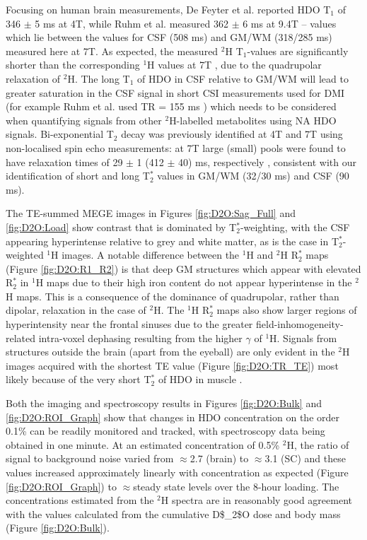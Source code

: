 Focusing on human brain measurements, De Feyter et al. \cite{DeFeyter2018DeuteriumVivo} reported HDO T$_1$ of 346 $\pm$ 5 ms at 4T, while Ruhm et al. \cite{Ruhm2021DeuteriumResolution} measured 362 $\pm$ 6 ms at 9.4T – values which lie between the values for \ac{CSF} (508 ms) and \ac{GM}/\ac{WM} (318/285 ms) measured here at 7T. As expected, the measured $^2$H T$_1$-values are significantly shorter than the corresponding $^1$H values at 7T \cite{Peters2007T27T}, due to the quadrupolar relaxation of $^2$H. The long T$_1$ of \ac{HDO} in \ac{CSF} relative to \ac{GM}/\ac{WM} will lead to greater saturation in the \ac{CSF} signal in short \ac{CSI} measurements used for \ac{DMI} (for example Ruhm et al. used TR = 155 ms \cite{Ruhm2021DeuteriumResolution}) which needs to be considered when quantifying signals from other $^2$H-labelled metabolites using \ac{NA} \ac{HDO} signals. Bi-exponential T$_2$ decay was previously identified at 4T \cite{DeFeyter2018DeuteriumVivo} and 7T \cite{Roig2022Deuterium7T} using non-localised spin echo measurements: at 7T  large (small) pools were found to have relaxation times of 29 $\pm$ 1 (412 $\pm$ 40) ms, respectively \cite{Roig2022Deuterium7T}, consistent with our identification of short and long T$_2^*$ values in \ac{GM}/\ac{WM} (32/30 ms) and \ac{CSF} (90 ms). 

The \ac{TE}-summed \ac{MEGE} images in Figures \ref{fig:D2O:Sag_Full} and \ref{fig:D2O:Load} show contrast that is dominated by T$_2^*$-weighting, with the \ac{CSF} appearing hyperintense relative to grey and white matter, as is the case in T$_2^*$-weighted $^1$H images. A notable difference between the $^1$H and $^2$H R$_2^*$ maps (Figure \ref{fig:D2O:R1_R2}) is that deep \ac{GM} structures which appear with elevated R$_2^*$ in $^1$H maps due to their high iron content \cite{Peters2007T27T} do not appear hyperintense in the $^2$H maps. This is a consequence of the dominance of quadrupolar, rather than dipolar, relaxation in the case of $^2$H. The $^1$H R$_2^*$ maps also show larger regions of hyperintensity near the frontal sinuses due to the greater field-inhomogeneity-related intra-voxel dephasing resulting from the higher $\gamma$ of $^1$H. Signals from structures outside the brain (apart from the eyeball) are only evident in the $^2$H images acquired with the shortest \ac{TE} value (Figure \ref{fig:D2O:TR_TE}) most likely because of the very short T$_2^*$ of \ac{HDO} in muscle \cite{Gursan2022ResidualMuscle,Damion2021NaturalT}.

Both the imaging and spectroscopy results in Figures \ref{fig:D2O:Bulk} and \ref{fig:D2O:ROI_Graph} show that changes in \ac{HDO} concentration on the order 0.1\% can be readily monitored and tracked, with spectroscopy data being obtained in one minute. At an estimated concentration of 0.5\% $^2$H, the ratio of signal to background noise varied from $\approx$2.7 (brain) to $\approx$3.1 (\ac{SC}) and these values increased approximately linearly with concentration as expected (Figure \ref{fig:D2O:ROI_Graph}) to $\approx$steady state levels over the 8-hour loading. The concentrations estimated from the $^2$H spectra are in reasonably good agreement with the values calculated from the cumulative \ac{D$_2$O} dose and body mass (Figure \ref{fig:D2O:Bulk}). 

